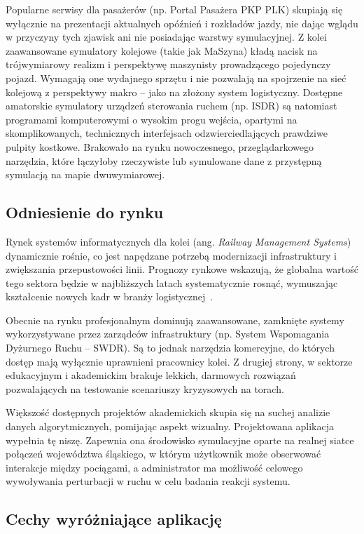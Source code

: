 \documentclass[twoside]{projektInzynierskiMS1z}
\begin{document}
Popularne serwisy dla pasażerów (np. Portal Pasażera PKP PLK) skupiają się wyłącznie
na prezentacji aktualnych opóźnień i rozkładów jazdy, nie dając wglądu w przyczyny
tych zjawisk ani nie posiadając warstwy symulacyjnej. Z kolei zaawansowane symulatory
kolejowe (takie jak MaSzyna) kładą nacisk na trójwymiarowy realizm i perspektywę
maszynisty prowadzącego pojedynczy pojazd. Wymagają one wydajnego sprzętu i nie
pozwalają na spojrzenie na sieć kolejową z perspektywy makro -- jako na złożony
system logistyczny. Dostępne amatorskie symulatory urządzeń sterowania ruchem
(np. ISDR) są natomiast programami komputerowymi o wysokim progu wejścia, opartymi
na skomplikowanych, technicznych interfejsach odzwierciedlających prawdziwe pulpity
kostkowe. Brakowało na rynku nowoczesnego, przeglądarkowego narzędzia, które
łączyłoby rzeczywiste lub symulowane dane z przystępną symulacją na mapie
dwuwymiarowej.

\subsection{Odniesienie do rynku}

Rynek systemów informatycznych dla kolei (ang. \emph{Railway Management Systems})
dynamicznie rośnie, co jest napędzane potrzebą modernizacji infrastruktury
i zwiększania przepustowości linii. Prognozy rynkowe wskazują, że globalna wartość
tego sektora będzie w najbliższych latach systematycznie rosnąć, wymuszając
kształcenie nowych kadr w branży logistycznej~\cite{railwaymarket}.

Obecnie na rynku profesjonalnym dominują zaawansowane, zamknięte systemy
wykorzystywane przez zarządców infrastruktury (np. System Wspomagania Dyżurnego
Ruchu -- SWDR). Są to jednak narzędzia komercyjne, do których dostęp mają wyłącznie
uprawnieni pracownicy kolei. Z drugiej strony, w sektorze edukacyjnym i akademickim
brakuje lekkich, darmowych rozwiązań pozwalających na testowanie scenariuszy
kryzysowych na torach.

Większość dostępnych projektów akademickich skupia się na suchej analizie danych
algorytmicznych, pomijając aspekt wizualny. Projektowana aplikacja wypełnia tę niszę.
Zapewnia ona środowisko symulacyjne oparte na realnej siatce połączeń województwa
śląskiego, w którym użytkownik może obserwować interakcje między pociągami,
a administrator ma możliwość celowego wywoływania perturbacji w ruchu w celu badania
reakcji systemu.

\subsection{Cechy wyróżniające aplikację}
\end{document}
